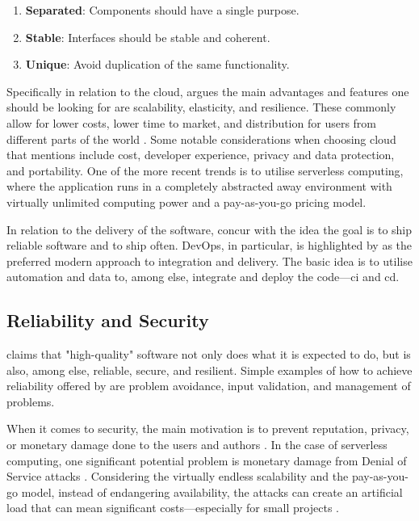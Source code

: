 \begin{enumerate}
    \item \textbf{Separated}: Components should have a single purpose.
    \item \textbf{Stable}: Interfaces should be stable and coherent.
    \item \textbf{Unique}: Avoid duplication of the same functionality.
\end{enumerate}

Specifically in relation to the cloud, \textcite[Chapter~5]{Sommerville_2019} argues the main advantages and features one should be looking for are scalability, elasticity, and resilience.
These commonly allow for lower costs, lower time to market, and distribution for users from different parts of the world \parencite[Chapter~5]{Sommerville_2019}.
Some notable considerations when choosing cloud that \textcite[Chapter~5]{Sommerville_2019} mentions include cost, developer experience, privacy and data protection, and portability.
One of the more recent trends is to utilise serverless computing, where the application runs in a completely abstracted away environment with virtually unlimited computing power and a pay-as-you-go pricing model.

In relation to the delivery of the software, \textcites[Chapter~10]{Sommerville_2019}[Chapter~7]{Fogel_2022} concur with the idea the goal is to ship reliable software and to ship often.
DevOps, in particular, is highlighted by \textcite[Chapter~10]{Sommerville_2019} as the preferred modern approach to integration and delivery.
The basic idea is to utilise automation and data to, among else, integrate and deploy the code---\gls{ci} and \gls{cd}.

\subsection{Reliability and Security}

\textcite[Chapter~8]{Sommerville_2019} claims that "high-quality" software not only does what it is expected to do, but is also, among else, reliable, secure, and resilient.
Simple examples of how to achieve reliability offered by \textcite[Chapter~8]{Sommerville_2019} are problem avoidance, input validation, and management of problems.

When it comes to security, the main motivation is to prevent reputation, privacy, or monetary damage done to the users and authors \textcite[Chapter~7]{Sommerville_2019}.
In the case of serverless computing, one significant potential problem is monetary damage from Denial of Service attacks \parencite{Kelly2021}.
Considering the virtually endless scalability and the pay-as-you-go model, instead of endangering availability, the attacks can create an artificial load that can mean significant costs---especially for small projects \parencite{Kelly2021}.

